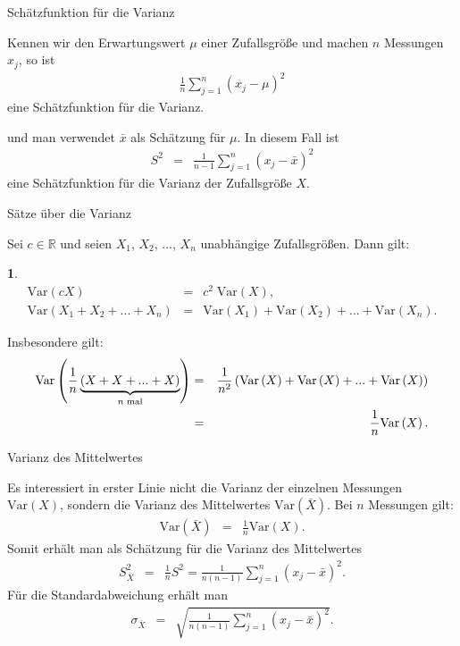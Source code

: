 \documentclass[german]{beamer}
\newcommand{\bq}{\begin{eqnarray*}}
\newcommand{\eq}{\end{eqnarray*}}
\newcommand{\superalert}[1]{{\color{MyYellowOrange}{#1}}}
\newtheorem*{myemptytheorem}{}
\begin{document}
\begin{frame}{Sch\"atzfunktion f\"ur die Varianz}

\alert{Kennen wir den Erwartungswert $\mu$} einer Zufallsgr\"o{\ss}e und machen $n$ Messungen $x_j$, so ist
\bq
 \frac{1}{n} \sum\limits_{j=1}^n \left( x_j - \mu \right)^2
\eq
eine Sch\"atzfunktion f\"ur die Varianz.

\vspace*{3mm}
\superalert{Im Allgemeinen ist $\mu$ aber nicht bekannt} und man verwendet $\bar{x}$ als Sch\"atzung f\"ur $\mu$.
In diesem Fall ist 
\bq
 S^2 & = & 
 \frac{1}{n-1} \sum\limits_{j=1}^n \left( x_j - \bar{x} \right)^2
\eq
eine Sch\"atzfunktion f\"ur die Varianz der Zufallsgr\"o{\ss}e $X$.

\end{frame}

\begin{frame}{S\"atze \"uber die Varianz}

Sei $c \in \mathbb R$ und seien $X_1$, $X_2$, ..., $X_n$ unabh\"angige Zufallsgr\"o{\ss}en.
Dann gilt:
\begin{myemptytheorem}
\bq
 \mbox{Var}\left( c X \right) & = & c^2 \; \mbox{Var}\left(X \right),
 \nonumber \\
 \mbox{Var}\left( X_1 + X_2 + ... + X_n  \right) & = & 
  \mbox{Var}\left(X_1 \right) + \mbox{Var}\left(X_2 \right) + ...
  + \mbox{Var}\left(X_n \right).
\eq
\end{myemptytheorem}
Insbesondere gilt:
\bq
 \mbox{Var}\left( \frac{1}{n} \underbrace{\left( X + X + ... + X  \right)}_{n\;\mbox{\scriptsize mal}} \right) & = & 
 \frac{1}{n^2} \left( 
  \mbox{Var}\left(X \right) + \mbox{Var}\left(X \right) + ...
  + \mbox{Var}\left(X \right) \right)
 \nonumber \\
 & = &
 \frac{1}{n} \mbox{Var}\left(X \right).
\eq

\end{frame}

\begin{frame}{Varianz des Mittelwertes}

Es interessiert in erster Linie nicht die Varianz der einzelnen Messungen $\mbox{Var}(X)$, sondern
die Varianz des Mittelwertes $\mbox{Var}(\bar{X})$.
Bei $n$ Messungen gilt:
\bq
 \mbox{Var}(\bar{X}) & = & \frac{1}{n} \mbox{Var}(X).
\eq
Somit erh\"alt man als Sch\"atzung f\"ur die Varianz des Mittelwertes
\bq
 S_{\bar{X}}^2 & = & \frac{1}{n} S^2
 = \frac{1}{n(n-1)} \sum\limits_{j=1}^n \left( x_j - \bar{x} \right)^2.
\eq
F\"ur die Standardabweichung erh\"alt man
\bq
 \sigma_{\bar{X}} & = & 
 \sqrt{ \frac{1}{n(n-1)} \sum\limits_{j=1}^n \left( x_j - \bar{x} \right)^2}.
\eq

\end{frame}
\end{document}

